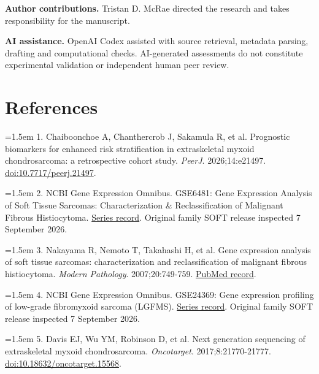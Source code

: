 \documentclass[11pt]{article}
\begin{document}
\textbf{Author contributions.} Tristan D. McRae directed the research and takes responsibility for the manuscript.\par

\textbf{AI assistance.} OpenAI Codex assisted with source retrieval, metadata parsing, drafting and computational checks. AI-generated assessments do not constitute experimental validation or independent human peer review.\par

\section*{References}

\noindent\hangindent=1.5em 1. Chaiboonchoe A, Chanthercrob J, Sakamula R, et al. Prognostic biomarkers for enhanced risk stratification in extraskeletal myxoid chondrosarcoma: a retrospective cohort study. \emph{PeerJ}. 2026;14:e21497. \href{https://doi.org/10.7717/peerj.21497}{doi:10.7717/peerj.21497}.\par\smallskip

\noindent\hangindent=1.5em 2. NCBI Gene Expression Omnibus. GSE6481: Gene Expression Analysis of Soft Tissue Sarcomas: Characterization \& Reclassification of Malignant Fibrous Histiocytoma. \href{https://www.ncbi.nlm.nih.gov/geo/query/acc.cgi?acc=GSE6481}{Series record}. Original family SOFT release inspected 7 September 2026.\par\smallskip

\noindent\hangindent=1.5em 3. Nakayama R, Nemoto T, Takahashi H, et al. Gene expression analysis of soft tissue sarcomas: characterization and reclassification of malignant fibrous histiocytoma. \emph{Modern Pathology}. 2007;20:749-759. \href{https://pubmed.ncbi.nlm.nih.gov/17464315/}{PubMed record}.\par\smallskip

\noindent\hangindent=1.5em 4. NCBI Gene Expression Omnibus. GSE24369: Gene expression profiling of low-grade fibromyxoid sarcoma (LGFMS). \href{https://www.ncbi.nlm.nih.gov/geo/query/acc.cgi?acc=GSE24369}{Series record}. Original family SOFT release inspected 7 September 2026.\par\smallskip

\noindent\hangindent=1.5em 5. Davis EJ, Wu YM, Robinson D, et al. Next generation sequencing of extraskeletal myxoid chondrosarcoma. \emph{Oncotarget}. 2017;8:21770-21777. \href{https://doi.org/10.18632/oncotarget.15568}{doi:10.18632/oncotarget.15568}.\par\smallskip
\end{document}
